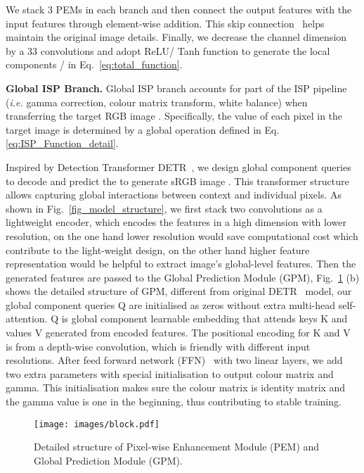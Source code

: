 \documentclass{bmvc2k}
\begin{document}
We stack 3 PEMs in each branch and then connect the output features with the input features through element-wise addition. This skip connection~\cite{ResNet} helps maintain the original image details. Finally,
we decrease the channel dimension by a 33 convolutions and adopt ReLU/ Tanh function to generate the local components /  in Eq.~\ref{eq:total_function}.



\textbf{Global ISP Branch.} 
Global ISP branch accounts for part of the ISP pipeline~\cite{ISP_flexisp,ISP_L3method,ISP_pipeline_eccv16,brooks2019unprocessing} (\textit{i.e.} gamma correction, colour matrix transform, white balance) when transferring the target RGB image . Specifically, the value of each pixel in the target image is determined by a global operation defined in Eq.\ref{eq:ISP_Function_detail}.

Inspired by Detection Transformer DETR~\cite{DETR},  we design global component queries to decode and predict the   to generate sRGB image . This transformer structure allows capturing global interactions between context and individual pixels. As shown in Fig.~\ref{fig_model_structure}, we first stack two convolutions as a lightweight encoder,
which encodes the features in a high dimension with lower resolution, on the one hand lower resolution would save computational cost which contribute to the light-weight design, on the other hand higher feature representation would be helpful to extract image's global-level features. Then the generated features are passed to the Global Prediction Module (GPM), Fig.~\ref{detailed_structure} (b) shows the detailed structure of GPM, different from original DETR~\cite{DETR} model,
our global component queries Q are initialised as zeros without extra multi-head self-attention. Q is global component learnable embedding that attends keys K and values V generated from encoded features. The positional encoding for K and V is from a depth-wise convolution, which is friendly with different input resolutions. After feed forward network (FFN)~\cite{ViT} with two linear layers, we add two extra parameters with special initialisation to output colour matrix and gamma. This initialisation makes sure the colour matrix is identity matrix  and the gamma value  is one in the beginning, thus contributing to stable training.

\begin{figure}[t]
    \centering
    \texttt{[image: images/block.pdf]}
    
    \caption{Detailed structure of Pixel-wise Enhancement Module (PEM) and Global Prediction Module (GPM).}
    \label{detailed_structure}
    
\end{figure}
\end{document}
